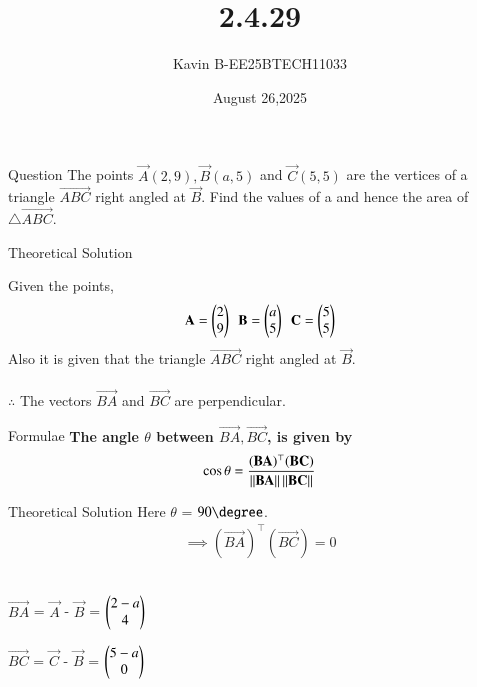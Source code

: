 \documentclass{beamer}
\begin{document}
\title 
{2.4.29}
\date{August 26,2025}


\author 
{Kavin B-EE25BTECH11033}






\frame{\titlepage}
\begin{frame}{Question}
The points $\vec{A}(2, 9), \vec{B}(a, 5) $ and $\vec{C}(5, 5)$ are the vertices of a triangle $\vec{ABC}$ right angled at $\vec{B}$. Find the values of a and hence the area of $\triangle \vec{ABC}$.
\end{frame}



\begin{frame}{Theoretical Solution}

Given the points,
\begin{align}
    \vec{A}=\begin{myvec}{2\\9}\end{myvec}\ \ 
    \vec{B}=\begin{myvec}{a\\5}\end{myvec}\ \ 
    \vec{C}=\begin{myvec}{5\\5}\end{myvec}
\end{align}
Also it is given that the triangle $\vec{ABC}$ right angled at $\vec{B}$.\\
\\
$\therefore$ The vectors $\vec{BA}$ and $\vec{BC}$ are perpendicular.\\
\end{frame}

\begin{frame}{Formulae}
\textbf{The angle $\theta$ between $\vec{BA}, \vec{BC}$,
is given by} 
\begin{align}
	\label{eq:angle-inner}
		\cos\theta=\frac{{(\mathbf{BA})^{\top}}{(\mathbf{BC})}}{\left\lVert\mathbf{BA}\right\rVert\left\lVert\mathbf{BC}\right\rVert}
\end{align}
\end{frame}


\begin{frame}{Theoretical Solution}
Here $\theta$ = $90\degree$.
\begin{align}
\implies {(\vec{BA})^{\top}}{(\vec{BC})} = 0
\end{align}\\
\begin{center}
$\vec{BA}$ = $\vec{A}$ - $\vec{B}$ = $\begin{pmatrix}2-a\\4\end{pmatrix}$
\end{center}
\begin{center}
$\vec{BC}$ = $\vec{C}$ - $\vec{B}$ = $\begin{pmatrix}5-a\\0\end{pmatrix}$
\end{center}

\end{frame}
\end{document}
